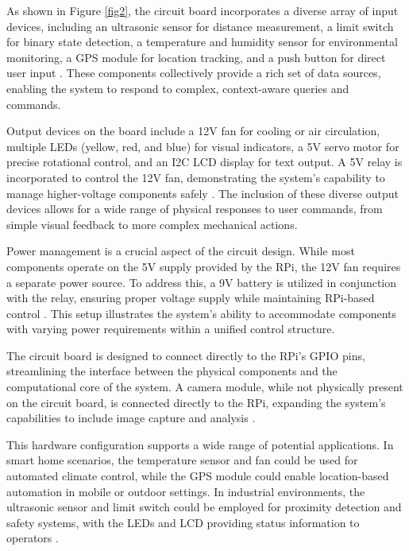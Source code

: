 \documentclass{ieeeaccess}
\begin{document}
As shown in Figure \ref{fig2}, the circuit board incorporates a diverse array of input devices, including an ultrasonic sensor for distance measurement, a limit switch for binary state detection, a temperature and humidity sensor for environmental monitoring, a GPS module for location tracking, and a push button for direct user input \cite{electronicwings_sensors_modules}. These components collectively provide a rich set of data sources, enabling the system to respond to complex, context-aware queries and commands.

Output devices on the board include a 12V fan for cooling or air circulation, multiple LEDs (yellow, red, and blue) for visual indicators, a 5V servo motor for precise rotational control, and an I2C LCD display for text output. A 5V relay is incorporated to control the 12V fan, demonstrating the system's capability to manage higher-voltage components safely \cite{smith2020}. The inclusion of these diverse output devices allows for a wide range of physical responses to user commands, from simple visual feedback to more complex mechanical actions.

Power management is a crucial aspect of the circuit design. While most components operate on the 5V supply provided by the RPi, the 12V fan requires a separate power source. To address this, a 9V battery is utilized in conjunction with the relay, ensuring proper voltage supply while maintaining RPi-based control \cite{monk2019}. This setup illustrates the system's ability to accommodate components with varying power requirements within a unified control structure.

The circuit board is designed to connect directly to the RPi's GPIO pins, streamlining the interface between the physical components and the computational core of the system. A camera module, while not physically present on the circuit board, is connected directly to the RPi, expanding the system's capabilities to include image capture and analysis \cite{pi_camera_2018}.

This hardware configuration supports a wide range of potential applications. In smart home scenarios, the temperature sensor and fan could be used for automated climate control, while the GPS module could enable location-based automation in mobile or outdoor settings. In industrial environments, the ultrasonic sensor and limit switch could be employed for proximity detection and safety systems, with the LEDs and LCD providing status information to operators \cite{mcmanus2021}.
\end{document}
